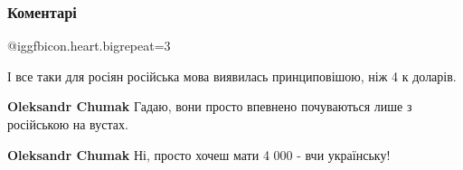  
 
 
 
 
\subsubsection{Коментарі}
\label{sec:09_09_2021.fb.bielskaja_elizaveta.1.jazyk_moshenniki.cmt}

\begin{itemize}

 
@igg{fbicon.heart.big}{repeat=3}


І все таки для росіян російська мова виявилась принциповішою, ніж 4 к доларів.

\begin{itemize}
 
\textbf{Oleksandr Chumak} Гадаю, вони просто впевнено почуваються лише з російською на вустах.

 
\textbf{Oleksandr Chumak} Ні, просто хочеш мати 4 000 - вчи українську! \Smiley[1.0][yellow]

 

\end{itemize}
\end{itemize}
